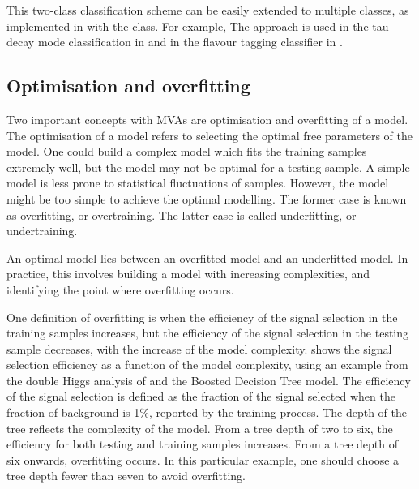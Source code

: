 
This two-class classification scheme can  be easily extended to multiple classes, as implemented in \TMVA with the \multiclass class. For example, The \multiclass approach is used in the tau decay mode classification in  and in the flavour tagging classifier in .


\subsection{Optimisation and overfitting}
\label{sec:pandoraMVAoptimisation}

Two important concepts with MVAs are optimisation and overfitting of a model. The optimisation of a model refers to selecting the optimal free parameters of the model. One could build a complex model which fits the training samples extremely well, but the model may not be optimal for a testing sample. A simple model is less prone to statistical fluctuations of samples. However, the model might be too simple to achieve the optimal modelling. The former case is known as overfitting, or overtraining. The latter case is called underfitting, or undertraining.


An optimal model lies between an overfitted model and an underfitted model. In practice, this involves building a model with increasing complexities, and identifying the point where overfitting occurs.

One definition of  overfitting is when the efficiency of the signal selection in the training samples increases, but the efficiency of the signal selection in the testing sample decreases, with the increase of the model complexity.  shows the signal selection efficiency as a function of the model complexity, using an example from the double Higgs analysis of  and the Boosted Decision Tree model. The efficiency of the signal selection is defined as the  fraction of the signal selected when the fraction of background  is 1\%, reported by the \TMVA training process. The depth of the tree  reflects the complexity of the model. From a tree depth of two to six, the efficiency for both testing and training samples increases. From a tree depth of six onwards, overfitting occurs. In this particular example, one should choose a tree depth fewer than seven to avoid overfitting.

